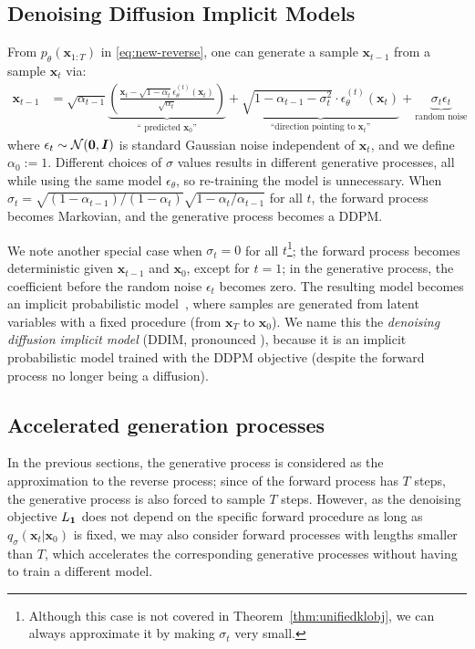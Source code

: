 \subsection{Denoising Diffusion Implicit Models}
\label{sec:reverse-family}
From $p_\theta(\bm{x}_{1:T})$ in \eqref{eq:new-reverse}, one can generate a sample $\bm{x}_{t-1}$ from a sample $\bm{x}_{t}$ via:
\begin{align}
    \bm{x}_{t-1} & = \sqrt{\alpha_{t-1}} \underbrace{\left(\frac{\bm{x}_t - \sqrt{1 - \alpha_t} \epsilon_\theta^{(t)}(\bm{x}_t)}{\sqrt{\alpha_t}}\right)}_{\text{`` predicted } \bm{x}_0 \text{''}} + \underbrace{\sqrt{1 - \alpha_{t-1} - \sigma_t^2} \cdot \epsilon_\theta^{(t)}(\bm{x}_t)}_{\text{``direction pointing to } \bm{x}_t \text{''}} + \underbrace{\sigma_t \epsilon_t}_{\text{random noise}} \label{eq:sample-eq-gen}
\end{align}
where $\epsilon_t \sim \mathcal{N}({\bm{0}}, \bm{I})$ is standard Gaussian noise independent of $\bm{x}_t$, and we define $\alpha_0 := 1$. Different choices of $\sigma$ values results in different generative processes, all while using the same model $\epsilon_\theta$, so re-training the model is unnecessary. When $\sigma_t = \sqrt{(1 - \alpha_{t-1}) / (1 - \alpha_t)} \sqrt{1 - \alpha_t / \alpha_{t-1}}$ for all $t$, the forward process becomes Markovian, and the generative process becomes a DDPM.

We note another special case when $\sigma_t = 0$ for all $t$\footnote{Although this case is not covered in Theorem~\ref{thm:unifiedklobj}, we can always approximate it by making $\sigma_t$ very small.}; the forward process becomes deterministic given $\bm{x}_{t-1}$ and $\bm{x}_0$, except for $t = 1$; in the generative process, the coefficient before the random noise $\epsilon_t$ becomes zero. %
    The resulting model becomes an implicit probabilistic model~\citep{mohamed2016learning}, where samples are generated from latent variables with a fixed procedure (from $\bm{x}_T$ to $\bm{x}_0$). We name this the \textit{denoising diffusion implicit model} (DDIM, pronounced ), because it is an implicit probabilistic model trained with the DDPM objective (despite the forward process no longer being a diffusion). 





\subsection{Accelerated generation processes}
\label{sec:acceleration}
In the previous sections, the generative process is considered as the approximation to the reverse process; since of the forward process has $T$ steps, the generative process is also forced to sample $T$ steps. However, as the denoising objective $L_{\bm{1}}$ does not depend on the specific forward procedure as long as $q_\sigma(\bm{x}_{t} | \bm{x}_0)$ is fixed, we may also consider forward processes with lengths smaller than $T$, which accelerates the corresponding generative processes without having to train a different model.


